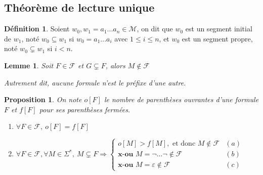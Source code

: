 \documentclass[]{article}
\newtheorem{myproposition}{Proposition}
\newtheorem{mylemma}{Lemme}
\theoremstyle{remark}
\theoremstyle{definition}
\newtheorem{mydef}{Définition}
\begin{document}
\subsection{Théorème de lecture unique}

\begin{mydef}
	Soient $w_0, w_1=a_1...a_n \in \mathcal{M}$, on dit que $w_0$ est un segment initial de $w_1$, noté $w_0 \subseteq w_1$ si $w_0=a_1...a_i$ avec $1 \leqslant i \leqslant n$, et $w_0$ est un segment propre, noté $w_0 \subsetneq w_1$ si $i < n$.
\end{mydef}

\begin{mylemma}
	Soit $F \in \mathcal{F}$ et $G \subsetneq F$, alors $M \notin \mathcal{F}$
	
	Autrement dit, aucune formule n'est le préfixe d'une autre.
\end{mylemma}

\begin{myproposition}
	On note $o[F]$ le nombre de parenthèses ouvrantes d'une formule $F$ et $f[F]$ pour ses parenthèses fermées.
	\begin{enumerate}
			\item $\forall F \in \mathcal{F}, ~ o[F]=f[F]$
			\item $\forall F \in \mathcal{F}, \forall M \in \Sigma^*, ~ M \subsetneq F \Longrightarrow
			\left\{
			\begin{array}{ll}
				o[M] > f[M], \text{ et donc } M \notin \mathcal{F} & (a) \\
				\textbf{x-ou } M = \neg ... \neg \notin \mathcal{F} & (b)\\
				\textbf{x-ou } M = \varepsilon \notin \mathcal{F} & (c)
			\end{array}
			\right.$
	\end{enumerate}
\end{myproposition}
\end{document}
